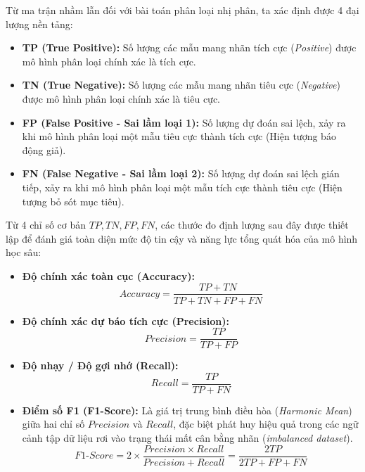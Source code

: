 \documentclass[a4paper,12pt]{article}
\begin{document}
Từ ma trận nhầm lẫn đối với bài toán phân loại nhị phân, ta xác định được 4 đại lượng nền tảng:
\begin{itemize}
    \item \textbf{TP (True Positive):} Số lượng các mẫu mang nhãn tích cực (\textit{Positive}) được mô hình phân loại chính xác là tích cực.
    \item \textbf{TN (True Negative):} Số lượng các mẫu mang nhãn tiêu cực (\textit{Negative}) được mô hình phân loại chính xác là tiêu cực.
    \item \textbf{FP (False Positive - Sai lầm loại 1):} Số lượng dự đoán sai lệch, xảy ra khi mô hình phân loại một mẫu tiêu cực thành tích cực (Hiện tượng báo động giả).
    \item \textbf{FN (False Negative - Sai lầm loại 2):} Số lượng dự đoán sai lệch gián tiếp, xảy ra khi mô hình phân loại một mẫu tích cực thành tiêu cực (Hiện tượng bỏ sót mục tiêu).
\end{itemize}

Từ 4 chỉ số cơ bản $TP, TN, FP, FN$, các thước đo định lượng sau đây được thiết lập để đánh giá toàn diện mức độ tin cậy và năng lực tổng quát hóa của mô hình học sâu:

\begin{itemize}
    \item \textbf{Độ chính xác toàn cục (Accuracy):}
    \begin{equation}
    Accuracy = \frac{TP + TN}{TP + TN + FP + FN}
    \end{equation}

    \item \textbf{Độ chính xác dự báo tích cực (Precision):}
    \begin{equation}
    Precision = \frac{TP}{TP + FP}
    \end{equation}

    \item \textbf{Độ nhạy / Độ gợi nhớ (Recall):}
    \begin{equation}
    Recall = \frac{TP}{TP + FN}
    \end{equation}

    \item \textbf{Điểm số F1 (F1-Score):} Là giá trị trung bình điều hòa (\textit{Harmonic Mean}) giữa hai chỉ số $Precision$ và $Recall$, đặc biệt phát huy hiệu quả trong các ngữ cảnh tập dữ liệu rơi vào trạng thái mất cân bằng nhãn (\textit{imbalanced dataset}).
    \begin{equation}
    F1\text{-}Score = 2 \times \frac{Precision \times Recall}{Precision + Recall} = \frac{2TP}{2TP + FP + FN}
    \end{equation}
\end{itemize}
\end{document}
